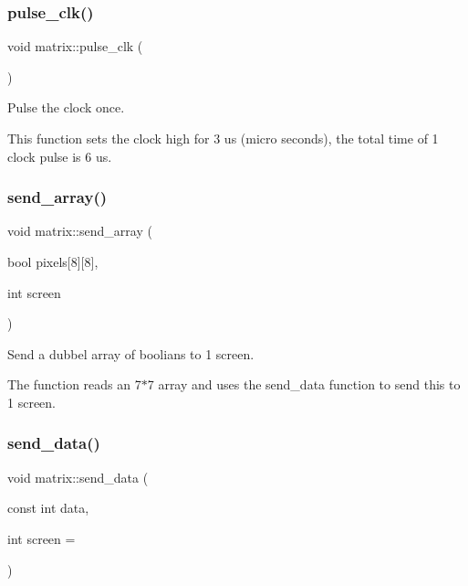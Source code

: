 \subsubsection{\texorpdfstring{pulse\+\_\+clk()}{pulse\_clk()}}
{\footnotesize\ttfamily void matrix\+::pulse\+\_\+clk (\begin{DoxyParamCaption}{ }\end{DoxyParamCaption})}



Pulse the clock once. 

This function sets the clock high for 3 us (micro seconds), the total time of 1 clock pulse is 6 us. \mbox{\label{classmatrix_a571b55cd680b70d9deb30aa8db10bfb9}} 
\subsubsection{\texorpdfstring{send\+\_\+array()}{send\_array()}}
{\footnotesize\ttfamily void matrix\+::send\+\_\+array (\begin{DoxyParamCaption}\item[{bool}]{pixels\mbox{[}8\mbox{]}\mbox{[}8\mbox{]},  }\item[{int}]{screen }\end{DoxyParamCaption})}



Send a dubbel array of boolians to 1 screen. 

The function reads an 7$\ast$7 array and uses the send\+\_\+data function to send this to 1 screen. \mbox{\label{classmatrix_a58b6def7e8de92f912efd37c329869f0}} 
\subsubsection{\texorpdfstring{send\+\_\+data()}{send\_data()}}
{\footnotesize\ttfamily void matrix\+::send\+\_\+data (\begin{DoxyParamCaption}\item[{const int}]{data,  }\item[{int}]{screen = {} }\end{DoxyParamCaption})}




